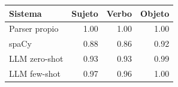 \begin{tabular}{lrrr}
\toprule
Sistema & Sujeto & Verbo & Objeto \\
\midrule
Parser propio & 1.00 & 1.00 & 1.00 \\
spaCy & 0.88 & 0.86 & 0.92 \\
LLM zero-shot & 0.93 & 0.93 & 0.99 \\
LLM few-shot & 0.97 & 0.96 & 1.00 \\
\bottomrule
\end{tabular}
